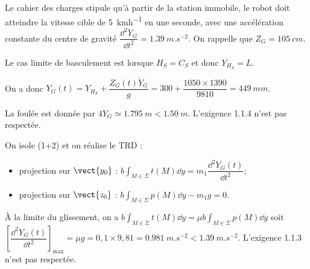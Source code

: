 \begin{multicols}{2}
Le cahier des charges stipule qu'à partir de la station immobile, le robot doit atteindre la vitesse cible de \SI{5}{kmh^{-1}} en une seconde, avec une accélération constante du centre de gravité $\dfrac{\dd^2 Y_G}{\dd t^2}=\SI{1,39}{m.s^{-2}}$.
On rappelle que $Z_G=\SI{105}{cm}$.

\fi


\ifprof
\begin{corrige}
Le cas limite de basculement est lorsque $H_S=C_S$ et donc $Y_{H_S}=L$. 

On a donc $Y_G(t) = Y_{H_S} + \dfrac{ Z_G(t) \ddot{Y}_G}{g} = 300+\dfrac{1050\times1390}{9 810} = \SI{449}{mm} $.

La foulée est donnée par $4Y_G\simeq  \SI{1,795}{m}<\SI{1,50}{m}$. L'exigence 1.1.4 n'est pas respectée.
\end{corrige}
\else
\fi



\ifprof
\begin{corrige}

On isole (1+2) et on réalise le TRD :
\begin{itemize}
\item projection sur $\vect{y_0}$ : $b\int_{M\in\Sigma}t(M) \dd y= m_1 \dfrac{\dd^2 Y_G(t)}{\dd t^2}$;

\item projection sur $\vect{z_0}$ : $b\int_{M\in\Sigma}p(M) \dd y - m_1 g  = 0$.
\end{itemize}

À la limite du glissement, on a $b\int_{M\in\Sigma}t(M) \dd y= \mu b\int_{M\in\Sigma}p(M) \dd y$ soit 
$\left[\dfrac{\dd^2 Y_G(t)}{\dd t^2}\right]_{\text{max}} = \mu  g = 0,1\times 9,81 = \SI{0,981}{m.s^{-2}} < \SI{1,39}{m.s^{-2}}$. L'exigence 1.1.3 n'est pas respectée. 
\end{corrige}
\else
\fi



\ifprof
\else
\end{multicols}
\fi


